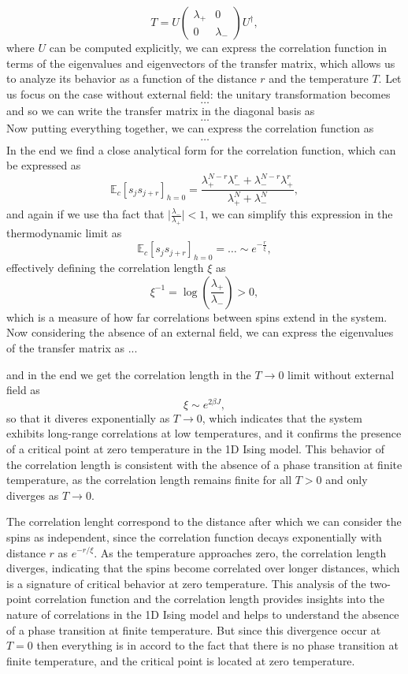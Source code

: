 \[
    T = U \begin{pmatrix}
        \lambda_+ & 0         \\
        0         & \lambda_-
    \end{pmatrix} U^{\dagger},
\]
where \(U\) can be computed explicitly, we can express the correlation function in terms of the eigenvalues and eigenvectors of the transfer matrix, which allows us to analyze its behavior as a function of the distance \(r\) and the temperature \(T\). Let us focus on the case without external field: the unitary transformation becomes
\[
    \dots
\]
and so we can write the transfer matrix in the diagonal basis as
\[
    \dots
\]
Now putting everything together, we can express the correlation function as
\[
    \begin{aligned}
        \dots
    \end{aligned}
\]
In the end we find a close analytical form for the correlation function, which can be expressed as
\[
    \mathbb{E}_{c}\left[ s_j s_{j+r} \right]_{h=0} = \frac{\lambda_+^{N-r}\lambda_-^r + \lambda_-^{N-r}\lambda_+^r}{\lambda_+^N + \lambda_-^N},
\]
and again if we use tha fact that \(\vert \frac{\lambda_-}{\lambda_+} \vert < 1\), we can simplify this expression in the thermodynamic limit as
\[
    \mathbb{E}_{c}\left[ s_j s_{j+r} \right]_{h=0} =\dots \sim e^{-\tfrac{r}{\xi}},
\]
effectively defining the correlation length \(\xi\) as
\[
    \xi^{-1} = \log(\frac{\lambda_+}{\lambda_-}) > 0,
\]
which is a measure of how far correlations between spins extend in the system.
Now considering the absence of an external field, we can express the eigenvalues of the transfer matrix as
...

and in the end we get the correlation length in the \(T \to 0\) limit without external field as
\[
    \xi \sim e^{2\beta J},
\]
so that it diveres exponentially as \(T \to 0\), which indicates that the system exhibits long-range correlations at low temperatures, and it confirms the presence of a critical point at zero temperature in the 1D Ising model. This behavior of the correlation length is consistent with the absence of a phase transition at finite temperature, as the correlation length remains finite for all \(T > 0\) and only diverges as \(T \to 0\).

The correlation lenght correspond to the distance after which we can consider the spins as independent, since the correlation function decays exponentially with distance \(r\) as \(e^{-r/\xi}\). As the temperature approaches zero, the correlation length diverges, indicating that the spins become correlated over longer distances, which is a signature of critical behavior at zero temperature. This analysis of the two-point correlation function and the correlation length provides insights into the nature of correlations in the 1D Ising model and helps to understand the absence of a phase transition at finite temperature. But since this divergence occur at \(T=0\) then everything is in accord to the fact that there is no phase transition at finite temperature, and the critical point is located at zero temperature.


